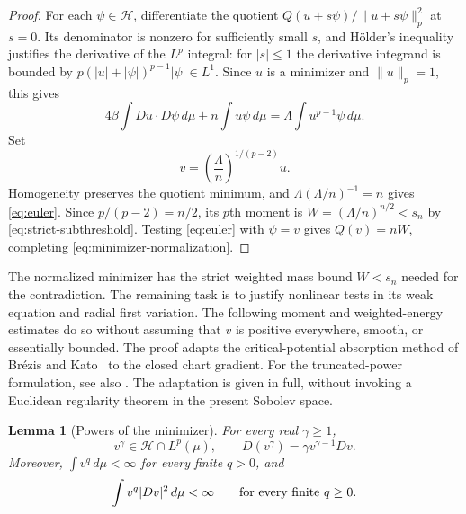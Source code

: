 \documentclass[11pt]{article}
\numberwithin{equation}{section}
\newtheorem{lemma}[theorem]{Lemma}
\theoremstyle{definition}
\theoremstyle{remark}
\begin{document}
\begin{proof}
For each $\psi\in\mathcal H$, differentiate the quotient
$Q(u+s\psi)/\|u+s\psi\|_p^2$ at $s=0$.  Its denominator is nonzero
for sufficiently small $s$, and H\"older's inequality justifies the
derivative of the $L^p$ integral: for $|s|\le1$ the derivative
integrand is bounded by
$p(|u|+|\psi|)^{p-1}|\psi|\in L^1$.  Since $u$ is a minimizer and
$\|u\|_p=1$, this gives
\[
 4\beta\int Du\cdot D\psi\,d\mu+n\int u\psi\,d\mu
 =\Lambda\int u^{p-1}\psi\,d\mu.
\]
Set
\[
 v=\left(\frac\Lambda n\right)^{1/(p-2)}u.
\]
Homogeneity preserves the quotient minimum, and
$\Lambda(\Lambda/n)^{-1}=n$ gives \eqref{eq:euler}.
Since $p/(p-2)=n/2$, its $p$th moment is
$W=(\Lambda/n)^{n/2}<s_n$ by
\eqref{eq:strict-subthreshold}.  Testing \eqref{eq:euler} with
$\psi=v$ gives $Q(v)=nW$, completing
\eqref{eq:minimizer-normalization}.
\end{proof}

The normalized minimizer has the strict weighted mass bound $W<s_n$
needed for the contradiction. The remaining task is to justify nonlinear
tests in its weak equation and radial first variation. The following
moment and weighted-energy estimates do so without assuming that $v$
is positive everywhere, smooth, or essentially bounded.
The proof adapts the critical-potential absorption method of
Br\'ezis and Kato~\cite{BrezisKato1979} to the closed chart gradient.
For the truncated-power formulation, see also \cite[Lemma~6, p.~178]{Brezis1986}.
The adaptation is given in full, without invoking a Euclidean regularity
theorem in the present Sobolev space.

\begin{lemma}[Powers of the minimizer]
\label{lem:powers}
For every real $\gamma\ge1$,
\[
 v^\gamma\in\mathcal H\cap L^p(\mu),\qquad
 D(v^\gamma)=\gamma v^{\gamma-1}Dv.
\]
Moreover, $\int v^q\,d\mu<\infty$ for every finite $q>0$, and
\begin{equation}
 \int v^q|Dv|^2\,d\mu<\infty
 \qquad\hbox{for every finite }q\ge0.
 \label{eq:polynomial-weighted-energy}
\end{equation}
\end{lemma}
\end{document}
